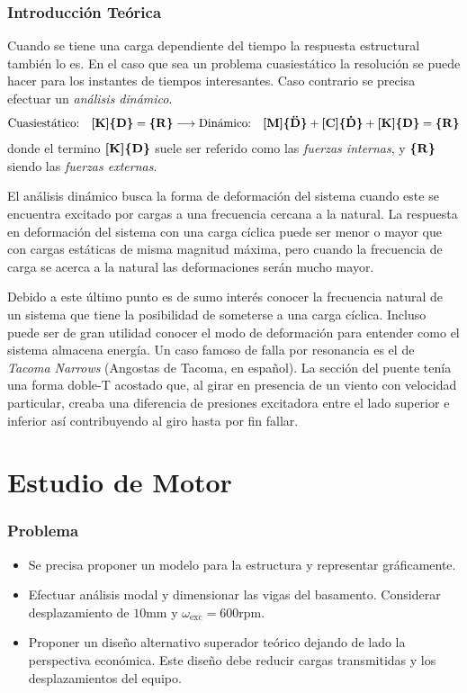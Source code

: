 \documentclass[onecolumn,10pt,titlepage,a4paper]{article}
\begin{document}
\setcounter{section}{-1}

\tableofcontents

\section{Introducción Teórica}
Cuando se tiene una carga dependiente del tiempo la respuesta estructural también lo es. En el caso que sea un problema cuasiestático la resolución se puede hacer para los instantes de tiempos interesantes. Caso contrario se precisa efectuar un \textit{análisis dinámico}.
\[
\text{Cuasiestático:}\quad \boldsymbol{[}\mathbf{K} \boldsymbol{]}\boldsymbol{\{ }\mathbf{D} \boldsymbol{\}} = \boldsymbol{\{ }\mathbf{R} \boldsymbol{\}} \longrightarrow \text{Dinámico:} \quad 
\boldsymbol{[}\mathbf{M} \boldsymbol{]} \boldsymbol{\{ }\mathbf{\ddot{D}} \boldsymbol{\}} + \boldsymbol{[}\mathbf{C} \boldsymbol{]}\boldsymbol{\{ }\mathbf{\dot{D}} \boldsymbol{\}} + \boldsymbol{[}\mathbf{K} \boldsymbol{]}\boldsymbol{\{ }\mathbf{D} \boldsymbol{\}} = \boldsymbol{\{ }\mathbf{R} \boldsymbol{\}}	
\]
donde el termino $\boldsymbol{[}\mathbf{K} \boldsymbol{]}\boldsymbol{\{ }\mathbf{D} \boldsymbol{\}}$ suele ser referido como las \textit{fuerzas internas}, y $\boldsymbol{\{ }\mathbf{R} \boldsymbol{\}}$ siendo las \textit{fuerzas externas}.

El análisis dinámico busca la forma de deformación del sistema cuando este se encuentra excitado por cargas a una frecuencia cercana a la natural. La respuesta en deformación del sistema con una carga cíclica puede ser menor o mayor que con cargas estáticas de misma magnitud máxima, pero cuando la frecuencia de carga se acerca a la natural las deformaciones serán mucho mayor. 

Debido a este último punto es de sumo interés conocer la frecuencia natural de un sistema que tiene la posibilidad de someterse a una carga cíclica. Incluso puede ser de gran utilidad conocer el modo de deformación para entender como el sistema almacena energía. Un caso famoso de falla por resonancia es el de \textit{Tacoma Narrows} (Angostas de Tacoma, en español). La sección del puente tenía una forma doble-T acostado que, al girar en presencia de un viento con velocidad particular, creaba una diferencia de presiones excitadora entre el lado superior e inferior así contribuyendo al giro hasta por fin fallar.


\part{Estudio de Motor}
\setcounter{section}{0}
\section{Problema}

\begin{itemize}
	\item Se precisa proponer un modelo para la estructura y representar gráficamente.
	\item Efectuar análisis modal y dimensionar las vigas del basamento. Considerar desplazamiento de $10$mm y $\omega_{\mathrm{exc}}=600\mathrm{rpm}$.
	\item Proponer un diseño alternativo superador teórico dejando de lado la perspectiva económica. Este diseño debe reducir cargas transmitidas y los desplazamientos del equipo.
\end{itemize}
\end{document}

